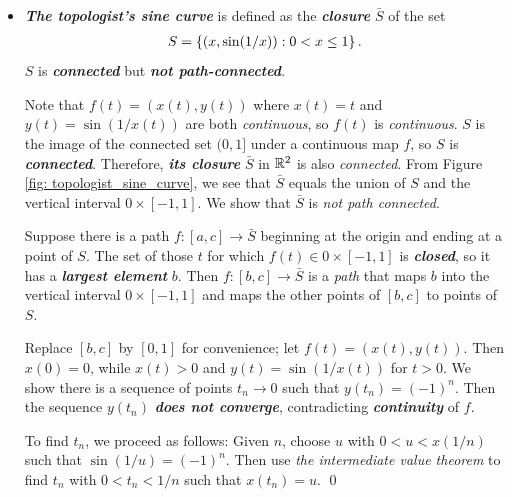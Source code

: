 \documentclass[11pt]{article}
\begin{document}
\begin{itemize}
\item \begin{example} 
\emph{\textbf{The topologist's sine curve}} is defined as the \emph{\textbf{closure}} $\bar{S}$ of the set
\begin{align*}
S = \left\{(x, \sin(1/x)): 0 < x \le 1\right\}.
\end{align*} $S$ is \emph{\textbf{connected}} but \emph{\textbf{not path-connected}}.

Note that $f(t)= (x(t), y(t))$ where $x(t) = t$ and $y(t) = \sin(1/x(t))$ are both \emph{continuous}, so $f(t)$ is \emph{continuous}.  $S$ is the image of the connected set $(0, 1]$ under a continuous map $f$, so $S$ is \emph{\textbf{connected}}. Therefore, \emph{\textbf{its closure}} $\bar{S}$ in ${\mathbb R}^2$ is also \emph{connected}.  From Figure \ref{fig: topologist_sine_curve}, we see that $\bar{S}$ equals the union of $S$ and the vertical interval $0 \times [-1, 1]$. We show that $\bar{S}$ is \emph{not path connected}.

Suppose there is a path $f : [a, c] \rightarrow \bar{S}$ beginning at the origin and ending at a point of $S$. The set of those $t$ for which $f(t) \in 0 \times [-1, 1]$ is \emph{\textbf{closed}}, so it has a \emph{\textbf{largest element}} $b$. Then $f : [b, c] \rightarrow \bar{S}$ is a \emph{path} that maps $b$ into the vertical interval $0 \times [-1, 1]$ and maps the other points of $[b, c]$ to points of $S$.

Replace $[b, c]$ by $[0, 1]$ for convenience; let $f(t) = (x(t), y(t))$. Then $x(0) = 0$, while  $x(t) > 0$ and $y(t) = \sin(1/x(t))$ for $t > 0$. We show there is a sequence of points $t_n \rightarrow 0$ such that $y(t_n) = (-1)^n$. Then the sequence $y(t_n)$ \emph{\textbf{does not converge}}, contradicting \emph{\textbf{continuity}} of $f$.

To find $t_n$, we proceed as follows: Given $n$, choose $u$ with $0 < u < x(1/n)$ such that $\sin(1/u) = (-1)^n$. Then use \emph{the intermediate value theorem} to find $t_n$ with $0 < t_n < 1/n$ such that $x(t_n) = u$. \qed
\end{example}
\end{itemize}
\end{document}
